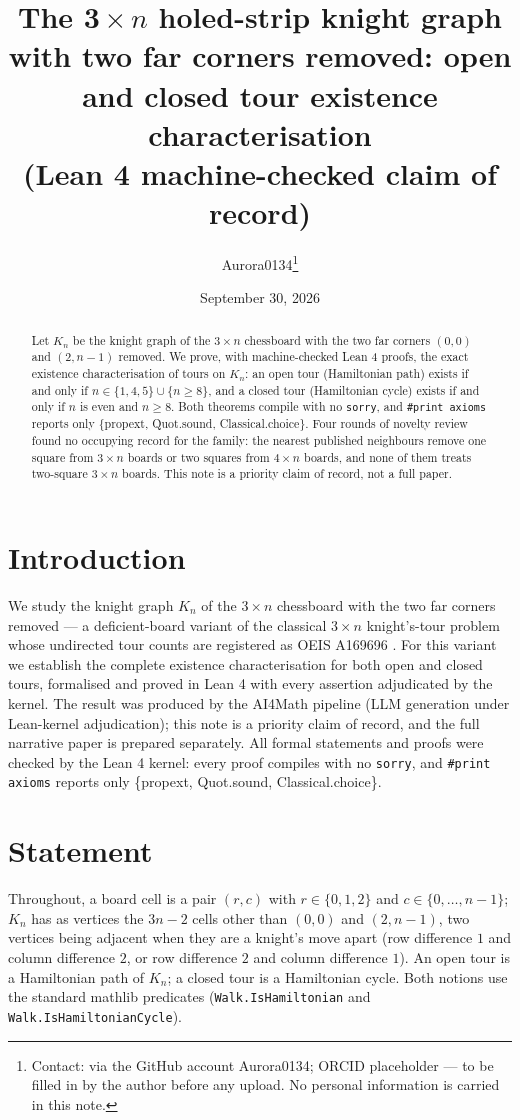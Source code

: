 \documentclass[11pt]{article}
\title{The 3\,$\times$\,$n$ holed-strip knight graph with two far corners
removed: open and closed tour existence characterisation\\ (Lean 4
machine-checked claim of record)}
\author{Aurora0134\thanks{Contact: via the GitHub account Aurora0134; ORCID
placeholder --- to be filled in by the author before any upload. No personal
information is carried in this note.}}
\date{September 30, 2026}
\begin{document}
\maketitle

\begin{abstract}
Let $K_n$ be the knight graph of the $3\times n$ chessboard with the two far
corners $(0,0)$ and $(2,n-1)$ removed. We prove, with machine-checked Lean 4
proofs, the exact existence characterisation of tours on $K_n$: an open tour
(Hamiltonian path) exists if and only if $n\in\{1,4,5\}\cup\{n\ge 8\}$, and a
closed tour (Hamiltonian cycle) exists if and only if $n$ is even and
$n\ge 8$. Both theorems compile with no \texttt{sorry}, and
\texttt{\#print axioms} reports only \{propext, Quot.sound,
Classical.choice\}. Four rounds of novelty review found no occupying record
for the family: the nearest published neighbours remove one square from
$3\times n$ boards or two squares from $4\times n$ boards, and none of them
treats two-square $3\times n$ boards. This note is a priority claim of
record, not a full paper.
\end{abstract}

\section{Introduction}

We study the knight graph $K_n$ of the $3\times n$ chessboard with the two
far corners removed --- a deficient-board variant of the classical $3\times
n$ knight's-tour problem whose undirected tour counts are registered as OEIS
A169696 \cite{a169696}. For this variant we establish the complete
existence characterisation for both open and closed tours, formalised and
proved in Lean 4 with every assertion adjudicated by the kernel. The result
was produced by the AI4Math pipeline (LLM generation under Lean-kernel
adjudication); this note is a priority claim of record, and the full
narrative paper is prepared separately. All formal statements and proofs
were checked by the Lean 4 kernel: every proof compiles with no
\texttt{sorry}, and \texttt{\#print axioms} reports only \{propext,
Quot.sound, Classical.choice\}.

\section{Statement}

Throughout, a board cell is a pair $(r,c)$ with $r\in\{0,1,2\}$ and
$c\in\{0,\dots,n-1\}$; $K_n$ has as vertices the $3n-2$ cells other than
$(0,0)$ and $(2,n-1)$, two vertices being adjacent when they are a knight's
move apart (row difference $1$ and column difference $2$, or row difference
$2$ and column difference $1$). An open tour is a Hamiltonian path of
$K_n$; a closed tour is a Hamiltonian cycle. Both notions use the standard
mathlib predicates \cite{mathlib} (\texttt{Walk.IsHamiltonian} and
\texttt{Walk.IsHamiltonianCycle}).
\end{document}
